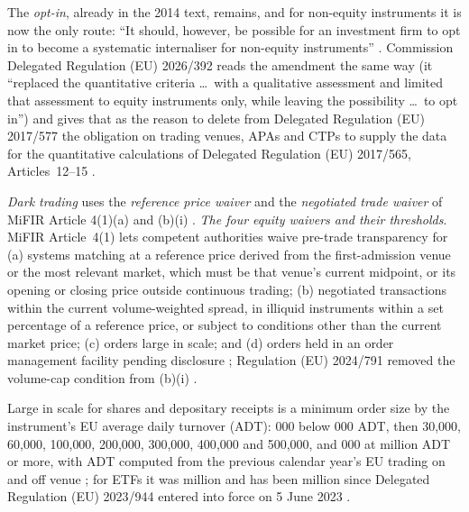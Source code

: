 \begin{qfrule}
The \emph{opt-in}, already in the 2014 text, remains, and for non-equity instruments it is now the only route: ``It should, however, be possible for an investment firm to opt in to become a systematic internaliser for non-equity instruments'' \citep[recital (7)]{eu-dir-2024-790}. Commission Delegated Regulation (EU) 2026/392 reads the amendment the same way (it ``replaced the quantitative criteria \dots\ with a qualitative assessment and limited that assessment to equity instruments only, while leaving the possibility \dots\ to opt in'') and gives that as the reason to delete from Delegated Regulation (EU) 2017/577 the obligation on trading venues, APAs and CTPs to supply the data for the quantitative calculations of Delegated Regulation (EU) 2017/565, Articles~12--15 \citep[recital (1)]{eu-reg-del-2026-392}.

\emph{Dark trading} uses the \emph{reference price waiver} and the \emph{negotiated trade waiver} of MiFIR Article 4(1)(a) and (b)(i) \citep[recital on the volume cap]{ex-eu-mifir-review-2024}. \emph{The four equity waivers and their thresholds}. MiFIR Article~4(1) lets competent authorities waive pre-trade transparency for (a) systems matching at a reference price derived from the first-admission venue or the most relevant market, which must be that venue's current midpoint, or its opening or closing price outside continuous trading; (b) negotiated transactions within the current volume-weighted spread, in illiquid instruments within a set percentage of a reference price, or subject to conditions other than the current market price; (c) orders large in scale; and (d) orders held in an order management facility pending disclosure \citep[Art.~4(1)--(2)]{eu-reg-600-2014}; Regulation (EU) 2024/791 removed the volume-cap condition from (b)(i) \citep[Art.~1(3)]{ex-eu-mifir-review-2024}.

Large in scale for shares and depositary receipts is a minimum order size by the instrument's EU average daily turnover (ADT): 000 below 000 ADT, then 30{,}000, 60{,}000, 100{,}000, 200{,}000, 300{,}000, 400{,}000 and 500{,}000, and 000 at  million ADT or more, with ADT computed from the previous calendar year's EU trading on and off venue \citep[Art.~7 and Annex~II, Table~1]{eu-rts1-2017-587}; for ETFs it was  million and has been  million since Delegated Regulation (EU) 2023/944 entered into force on 5 June 2023 \citep[Art.~1(4)]{eu-rts1-amend-2023-944}.


\end{qfrule}
